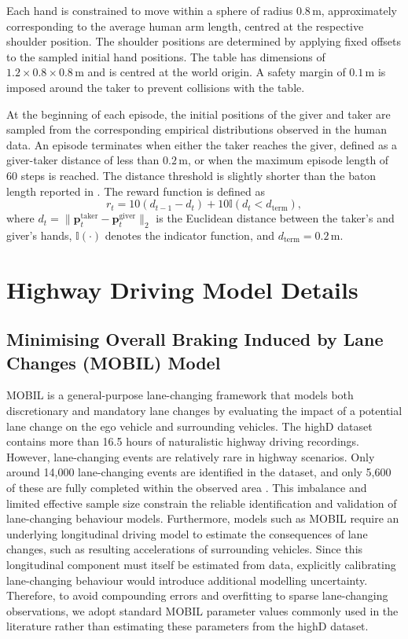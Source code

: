 \documentclass[journal]{IEEEtran}
\begin{document}
Each hand is constrained to move within a sphere of radius $0.8\,\mathrm{m}$, approximately corresponding to the average human arm length, centred at the respective shoulder position. The shoulder positions are determined by applying fixed offsets to the sampled initial hand positions. The table has dimensions of $1.2 \times 0.8 \times 0.8\,\mathrm{m}$ \cite{khanna_MultimodalDataSet_2023} and is centred at the world origin. A safety margin of $0.1\,\mathrm{m}$ is imposed around the taker to prevent collisions with the table.

At the beginning of each episode, the initial positions of the giver and taker are sampled from the corresponding empirical distributions observed in the human data. An episode terminates when either the taker reaches the giver, defined as a giver-taker distance of less than $0.2\,\mathrm{m}$, or when the maximum episode length of 60 steps is reached. The distance threshold is slightly shorter than the baton length reported in \cite{khanna_MultimodalDataSet_2023}. The reward function is defined as
\begin{equation}
    r_t =
    10(d_{t-1} - d_t)
    + 10\mathbb{I}(d_t < d_{\mathrm{term}}),
\end{equation}
where
$d_t = \lVert \mathbf{p}_{t}^{\mathrm{taker}} - \mathbf{p}_{t}^{\mathrm{giver}} \rVert_2$
is the Euclidean distance between the taker's and giver's hands, $\mathbb{I}(\cdot)$ denotes the indicator function, and $d_{\mathrm{term}} = 0.2\,\mathrm{m}$.

\section{Highway Driving Model Details}

\subsection{Minimising Overall Braking Induced by Lane Changes (MOBIL) Model}\label{subsec:mobil}

MOBIL is a general-purpose lane-changing framework that models both discretionary and mandatory lane changes by evaluating the impact of a potential lane change on the ego vehicle and surrounding vehicles. The highD dataset contains more than 16.5 hours of naturalistic highway driving recordings. However, lane-changing events are relatively rare in highway scenarios. Only around 14,000 lane-changing events are identified in the dataset, and only 5,600 of these are fully completed within the observed area \cite{highDdataset}. This imbalance and limited effective sample size constrain the reliable identification and validation of lane-changing behaviour models. Furthermore, models such as MOBIL require an underlying longitudinal driving model to estimate the consequences of lane changes, such as resulting accelerations of surrounding vehicles. Since this longitudinal component must itself be estimated from data, explicitly calibrating lane-changing behaviour would introduce additional modelling uncertainty. Therefore, to avoid compounding errors and overfitting to sparse lane-changing observations, we adopt standard MOBIL parameter values commonly used in the literature rather than estimating these parameters from the highD dataset.
\end{document}
